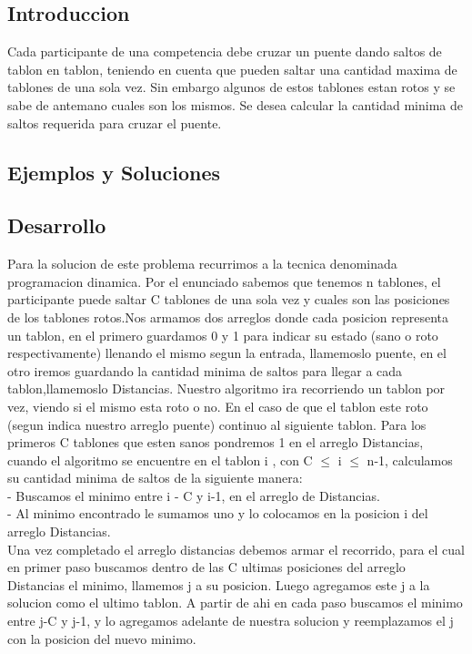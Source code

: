 \subsection{Introduccion} 
Cada participante de una competencia debe cruzar un puente dando saltos de tablon en tablon, teniendo en cuenta que pueden saltar una cantidad maxima de tablones de una sola vez. Sin embargo algunos de estos tablones estan rotos y se sabe de antemano cuales son los mismos. 
Se desea calcular la cantidad minima de saltos requerida para cruzar el puente.

\subsection{Ejemplos y Soluciones}


\subsection{Desarrollo}
Para la solucion de este problema recurrimos a la tecnica denominada programacion dinamica. 
Por el enunciado sabemos que tenemos n tablones, el participante puede saltar C tablones de una sola vez y cuales son las posiciones de los tablones rotos.Nos armamos dos arreglos donde cada posicion representa un tablon, en el primero guardamos 0 y 1 para indicar su estado (sano o roto respectivamente) llenando el mismo segun la entrada, llamemoslo puente, en el otro iremos guardando la cantidad minima de saltos para llegar a cada tablon,llamemoslo Distancias.
Nuestro algoritmo ira recorriendo un tablon por vez, viendo si el mismo esta roto o no. En el caso de que el tablon este roto (segun indica nuestro arreglo puente) continuo al siguiente tablon.
Para los primeros C tablones que esten sanos pondremos 1 en el arreglo Distancias, cuando el algoritmo se encuentre en el tablon i , con C $\leq$ i $\leq $ n-1, calculamos su cantidad minima de saltos de la siguiente manera:\\
- Buscamos el minimo entre i - C y i-1, en el arreglo de Distancias.\\
- Al minimo encontrado le sumamos uno y lo colocamos en la posicion i del arreglo Distancias.\\
Una vez completado el arreglo distancias debemos armar el recorrido, para el cual en primer paso buscamos dentro de las C ultimas posiciones del arreglo Distancias el minimo, llamemos j a su posicion. Luego agregamos este j a la solucion como el ultimo tablon.
A partir de ahi en cada paso buscamos el minimo entre j-C y j-1, y lo agregamos adelante de nuestra solucion y reemplazamos el j con la posicion del nuevo minimo.
